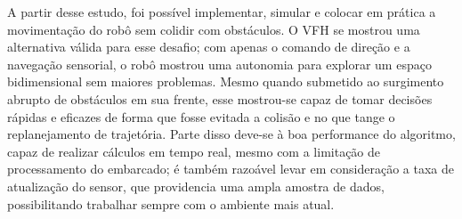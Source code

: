A partir desse estudo, foi possível implementar, simular e colocar 
em prática a movimentação do robô sem colidir com obstáculos. O VFH
se mostrou uma alternativa válida para esse desafio; com apenas o 
comando de direção e a navegação sensorial, o robô mostrou uma autonomia
para explorar um espaço bidimensional sem maiores problemas. Mesmo quando
submetido ao surgimento abrupto de obstáculos em sua frente, esse mostrou-se
capaz de tomar decisões rápidas e eficazes de forma que fosse evitada a
colisão e no que tange o replanejamento de trajetória. Parte disso deve-se à
boa performance do algoritmo, capaz de realizar cálculos em tempo real, mesmo
com a limitação de processamento do embarcado; é também razoável levar em
consideração a taxa de atualização do sensor, que providencia uma ampla 
amostra de dados, possibilitando trabalhar sempre com o ambiente mais atual.
